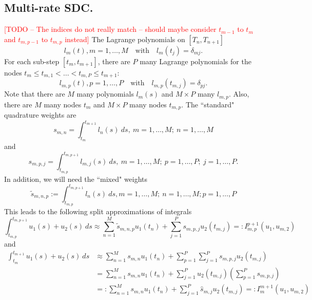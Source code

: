 \documentclass{article}
\newcommand{\todo}[1]{\textcolor{red}{[TODO -- #1]}}
\begin{document}
\subsection{Multi-rate SDC.}
\todo{The indices do not really match -- should maybe consider $t_{m-1}$ to $t_m$ and $t_{m,p-1}$ to $t_{m,p}$ instead}
The Lagrange polynomials on $[T_n, T_{n+1}]$
\begin{equation}
	l_m(t), m = 1, \ldots, M \quad \text{with} \quad l_m(t_j) = \delta_{mj}.
\end{equation}
For each sub-step $[t_m, t_{m+1}]$, there are $P$ many Lagrange polynomials for the nodes $t_{m} \leq t_{m,1} < \ldots < t_{m,P} \leq t_{m+1}$:
\begin{equation}
	l_{m,p}(t), p=1, \ldots, P \quad \text{with} \quad l_{m,p}(t_{m,j}) = \delta_{pj}.
\end{equation}
Note that there are $M$ many polynomials $l_m(s)$ and $M \times P$ many $l_{m,p}$.
Also, there are $M$ many nodes $t_m$ and $M \times P$ many nodes $t_{m,p}$.
The ``standard" quadrature weights are
\begin{equation}
	s_{m,n} = \int_{t_m}^{t_{m+1}} l_n(s)~ds, \ m=1, \ldots, M; \ n=1, \ldots, M
\end{equation}
and
\begin{equation}
	s_{m,p,j} = \int_{t_{m,p}}^{t_{m,p+1}}  l_{m,j}(s)~ds, \ m=1, \ldots, M; \ p=1, \ldots, P; \ j=1, \ldots, P.
\end{equation}
In addition, we will need the ``mixed" weights
\begin{equation}
	\tilde{s}_{m,n,p} := \int_{t_{m,p}}^{t_{m,p+1}} l_{n}(s)~ds, m=1, \ldots, M; \ n=1, \ldots, M; p=1, \ldots, P
\end{equation}
This leads to the following split approximations of integrals
\begin{equation}
	\int_{t_{m,p}}^{t_{m,p+1}} u_1(s) + u_2(s)~ds \approx \sum_{n=1}^{M} \tilde{s}_{m,n,p} u_1(t_{n}) + \sum_{j=1}^{P} s_{m,p,j} u_2(t_{m,j}) =: I_{m,p}^{p+1}(u_1,u_{m,2})
\end{equation}
and
\begin{align*}
	\int_{t_m}^{t_{m+1}} u_1(s) + u_2(s)~ds &\approx \sum_{n=1}^{M} s_{m,n} u_1(t_n) + \sum_{p=1}^{P} \sum_{j=1}^{P} s_{m,p,j} u_2(t_{m,j}) \\
					&=  \sum_{n=1}^{M} s_{m,n} u_1(t_n) + \sum_{j=1}^{P} u_2(t_{m,j}) \left( \sum_{p=1}^{P} s_{m,p,j} \right) \\
					&=: \sum_{n=1}^{M} s_{m,n} u_1(t_n) + \sum_{j=1}^{P} \hat{s}_{m,j} u_2(t_{m,j}) =: I_m^{m+1}(u_1, u_{m,2})
\end{align*}
\end{document}
